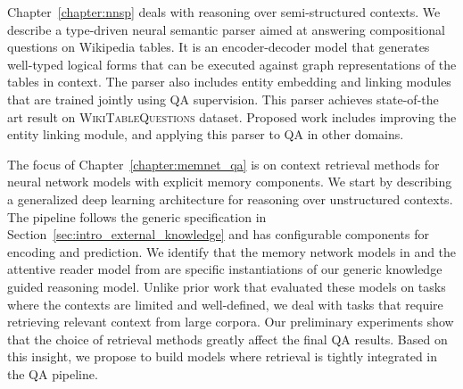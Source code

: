 Chapter~\ref{chapter:nnsp} deals with reasoning over semi-structured contexts. We describe a type-driven
neural semantic parser aimed at answering compositional questions on Wikipedia tables. It is an encoder-decoder model that generates
well-typed logical forms that can be executed against graph representations of the tables in context. The parser also includes entity embedding
and linking modules that are trained jointly using QA supervision. This parser achieves state-of-the art result on \textsc{WikiTableQuestions} dataset.
Proposed work includes improving the entity linking module, and applying this parser to QA in other domains.

The focus of Chapter~\ref{chapter:memnet_qa} is on context retrieval methods for neural network models with explicit memory components.
We start by describing a generalized deep learning architecture for reasoning over unstructured contexts. The pipeline follows the generic
specification in Section~\ref{sec:intro_external_knowledge} and has configurable components
for encoding and prediction. We identify that the memory network models in \cite{weston2014memory,Sukhbaatar2015EndToEndMN,Xiong2016DynamicMN}
and the attentive reader model from \cite{hermann2015teaching} are specific instantiations of our generic knowledge guided reasoning model.
Unlike prior work that evaluated these models on tasks where the contexts are limited and well-defined, we deal with tasks that require
retrieving relevant context from large corpora. Our preliminary experiments show that the choice of retrieval methods greatly affect the
final QA results. Based on this insight, we propose to build models where retrieval is tightly integrated in the QA pipeline.

